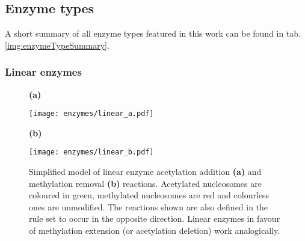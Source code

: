         \subsection{Enzyme types}
            \label{subsec:EnzymeTypes}
            A short summary of all enzyme types featured in this work can be found in tab. \ref{img:enzymeTypeSummary}.

            \subsubsection*{Linear enzymes}

                \begin{figure}[htpb!]
                    \centering
                    \begin{minipage}[t][5cm]{\textwidth}
                        \begin{minipage}{0.15\textwidth}
                            \caption*{\small \textbf{(a)}}
                        \end{minipage}
                        \begin{minipage}{0.8\textwidth}
                            \texttt{[image: enzymes/linear\_a.pdf]}
                        \end{minipage}
                        \vfill
                        \begin{minipage}{0.15\textwidth}
                            \caption*{\small \textbf{(b)}}
                        \end{minipage}
                        \begin{minipage}{0.8\textwidth}
                            \texttt{[image: enzymes/linear\_b.pdf]}
                        \end{minipage}
                    \end{minipage}
                    \caption{Simplified model of linear enzyme acetylation addition \textbf{(a)} and methylation removal \textbf{(b)} reactions. Acetylated nucleosomes are coloured in green, methylated nucleosomes are red and colourless ones are unmodified. The reactions shown are also defined in the rule set to occur in the opposite direction. Linear enzymes in favour of methylation extension (or acetylation deletion) work analogically.}
                    \label{img:linearEnzymes}
                \end{figure}

